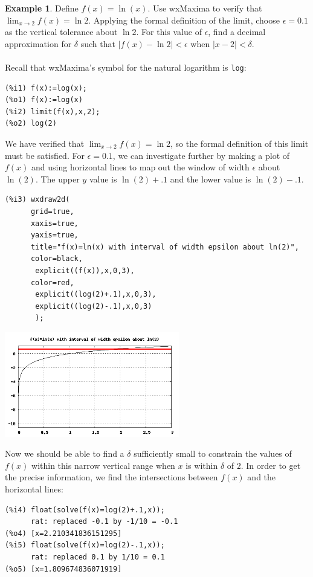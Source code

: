 \documentclass[10.5pt,twoside]{report}
\theoremstyle{definition}
\newtheorem{exmp}{Example}[section]
\begin{document}
\begin{exmp}  Define $f(x)=\ln(x)$.  Use wxMaxima to verify that $\lim_{x \to 2}f(x)=\ln{2}$.  Applying the formal definition of the limit, choose $\epsilon=0.1$ as the vertical tolerance about $\ln{2}$.  For this value of $\epsilon$, find a decimal approximation for $\delta$ such that $|f(x)-\ln{2}|<\epsilon$ when $|x-2|<\delta$.\\
${}$\\

Recall that wxMaxima's symbol for the natural logarithm is \verb|log|:

\begin{verbatim}
(%i1) f(x):=log(x);
(%o1) f(x):=log(x)
(%i2) limit(f(x),x,2);
(%o2) log(2)
\end{verbatim}

We have verified that $\lim_{x \to 2}f(x)=\ln{2}$, so the formal definition of this limit must be satisfied.  For $\epsilon=0.1$, we can investigate further by making a plot of $f(x)$ and using horizontal lines to map out the window of width $\epsilon$ about $\ln(2)$.  The upper $y$ value is $\ln(2)+.1$ and the lower value is $\ln(2)-.1$.

\begin{verbatim}
(%i3) wxdraw2d(
      grid=true,
      xaxis=true,
      yaxis=true,
      title="f(x)=ln(x) with interval of width epsilon about ln(2)",
      color=black,
       explicit((f(x)),x,0,3),
      color=red,
       explicit((log(2)+.1),x,0,3),
       explicit((log(2)-.1),x,0,3)
       );
\end{verbatim}

\includegraphics[width=3in]{example_3_3_1_1}



Now we should be able to find a $\delta$ sufficiently small to constrain the values of $f(x)$ within this narrow vertical range when $x$ is within $\delta$ of $2$.  In order to get the precise information, we find the intersections between $f(x)$ and the horizontal lines:

\begin{verbatim}
(%i4) float(solve(f(x)=log(2)+.1,x));
      rat: replaced -0.1 by -1/10 = -0.1
(%o4) [x=2.210341836151295]
(%i5) float(solve(f(x)=log(2)-.1,x));
      rat: replaced 0.1 by 1/10 = 0.1
(%o5) [x=1.809674836071919]
\end{verbatim}


\end{exmp}
\end{document}
